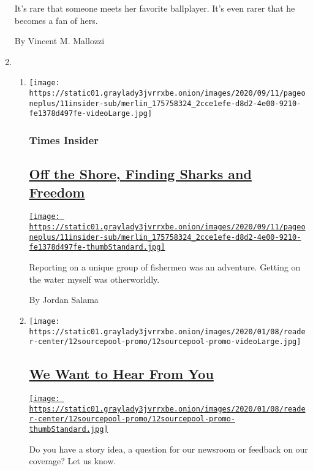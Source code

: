\begin{enumerate}
  It's rare that someone meets her favorite ballplayer. It's even rarer
  that he becomes a fan of hers.

  By Vincent M. Mallozzi
\item
  \begin{enumerate}
  \def\labelenumii{\arabic{enumii}.}
  \item
    \texttt{[image: https://static01.graylady3jvrrxbe.onion/images/2020/09/11/pageoneplus/11insider-sub/merlin\_175758324\_2cce1efe-d8d2-4e00-9210-fe1378d497fe-videoLarge.jpg]}

    \hypertarget{times-insider-2}{%
    \subsubsection{Times Insider}\label{times-insider-2}}

    \hypertarget{off-the-shore-finding-sharks-and-freedom}{%
    \subsection{\texorpdfstring{\href{/2020/09/06/insider/shark-fishing.html}{Off
    the Shore, Finding Sharks and
    Freedom}}{Off the Shore, Finding Sharks and Freedom}}\label{off-the-shore-finding-sharks-and-freedom}}

    \href{/2020/09/06/insider/shark-fishing.html}{\texttt{[image: https://static01.graylady3jvrrxbe.onion/images/2020/09/11/pageoneplus/11insider-sub/merlin\_175758324\_2cce1efe-d8d2-4e00-9210-fe1378d497fe-thumbStandard.jpg]}}

    Reporting on a unique group of fishermen was an adventure. Getting
    on the water myself was otherworldly.

    By Jordan Salama
  \item
    \texttt{[image: https://static01.graylady3jvrrxbe.onion/images/2020/01/08/reader-center/12sourcepool-promo/12sourcepool-promo-videoLarge.jpg]}

    \hypertarget{we-want-to-hear-from-you}{%
    \subsection{\texorpdfstring{\href{/2019/10/15/homepage/contact-newsroom.html}{We
    Want to Hear From
    You}}{We Want to Hear From You}}\label{we-want-to-hear-from-you}}

    \href{/2019/10/15/homepage/contact-newsroom.html}{\texttt{[image: https://static01.graylady3jvrrxbe.onion/images/2020/01/08/reader-center/12sourcepool-promo/12sourcepool-promo-thumbStandard.jpg]}}

    Do you have a story idea, a question for our newsroom or feedback on
    our coverage? Let us know.
  \end{enumerate}
\end{enumerate}

